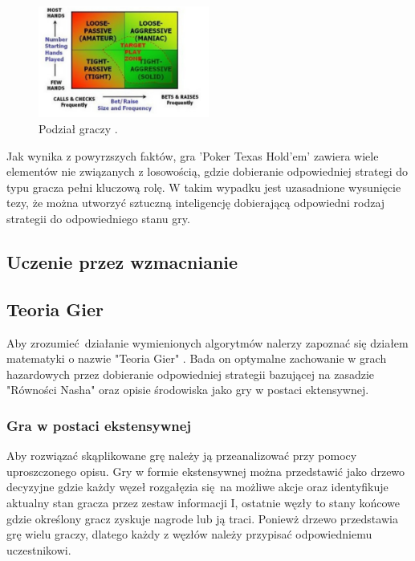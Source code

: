 \documentclass[12pt,oneside,a4paper]{report}
\begin{document}
\begin{figure}[h!]
            \center
           \includegraphics[width=0.5\textwidth]{./img/class.pdf}
           \caption{Podział graczy \cite{class}.}
\end{figure}


Jak wynika z powyrzszych faktów, gra 'Poker Texas Hold'em' zawiera wiele elementów nie związanych z
losowością, gdzie dobieranie odpowiedniej strategi do typu gracza pełni kluczową rolę. W takim
wypadku jest uzasadnione wysunięcie tezy, że można utworzyć sztuczną inteligencję dobierającą
odpowiedni rodzaj strategii do odpowiedniego stanu gry.

\subsection{Uczenie przez wzmacnianie}



\subsection{Teoria Gier}

Aby zrozumieć działanie wymienionych algorytmów nalerzy zapoznać się
działem matematyki o nazwie "Teoria Gier" \cite{gt}. Bada on optymalne zachowanie w grach
hazardowych przez dobieranie odpowiedniej strategii bazującej na zasadzie "Równości Nasha" oraz 
opisie środowiska jako gry w postaci ektensywnej.

\subsubsection{Gra w postaci ekstensywnej}

Aby rozwiązać skąplikowane grę należy ją przeanalizować przy pomocy uproszczonego opisu. Gry w
formie ekstensywnej można przedstawić jako drzewo decyzyjne gdzie każdy węzeł rozgałęzia się na
możliwe akcje oraz identyfikuje aktualny stan gracza przez zestaw informacji I,
ostatnie węzły to stany końcowe gdzie określony gracz zyskuje nagrode lub ją traci.
Poniewż drzewo przedstawia grę wielu graczy, dlatego każdy z węzłów należy przypisać odpowiedniemu
uczestnikowi. 
\end{document}
